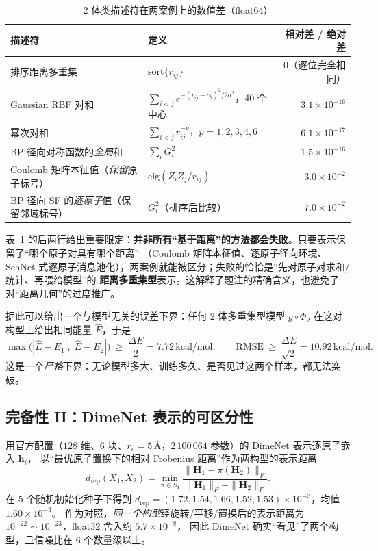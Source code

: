 \documentclass[UTF8,a4paper,11pt]{ctexart}
\newcommand{\kcal}{\,\mathrm{kcal/mol}}
\newcommand{\ang}{\,\text{\AA}}
\begin{document}
\begin{table}[H]
\centering\small
\caption{2 体类描述符在两案例上的数值差（float64）}
\label{tab:2body}
\begin{tabular}{@{}llr@{}}
\toprule
描述符 & 定义 & 相对差 / 绝对差\\
\midrule
排序距离多重集 & $\mathrm{sort}\{r_{ij}\}$ & $0$（逐位完全相同）\\
Gaussian RBF 对和 & $\sum_{i<j}e^{-(r_{ij}-c_k)^2/2\sigma^2}$，40 个中心 & $3.1\times10^{-16}$\\
幂次对和 & $\sum_{i<j}r_{ij}^{-p}$，$p=1,2,3,4,6$ & $6.1\times10^{-17}$\\
BP 径向对称函数\cite{bp}的\emph{全局}和 & $\sum_i G^2_i$ & $1.5\times10^{-16}$\\
\midrule
Coulomb 矩阵本征值\cite{cm}（\emph{保留}原子标号） & $\mathrm{eig}(Z_iZ_j/r_{ij})$ & $3.0\times10^{-2}$\\
BP 径向 SF 的\emph{逐原子}值（保留邻域标号） & $G^2_i$（排序后比较） & $7.0\times10^{-2}$\\
\bottomrule
\end{tabular}
\end{table}

表~\ref{tab:2body} 的后两行给出重要限定：\textbf{并非所有“基于距离”的方法都会失败}。只要表示保留了“哪个原子对具有哪个距离”
（Coulomb 矩阵本征值、逐原子径向环境、SchNet 式逐原子消息池化），两案例就能被区分；失败的恰恰是“先对原子对求和/统计、再喂给模型”的
\textbf{距离多重集型}表示。这解释了题注的精确含义，也避免了对“距离几何”的过度推广。

据此可以给出一个与模型无关的误差下界：任何 2 体多重集型模型 $g\circ\Phi_2$ 在这对构型上给出相同能量 $\hat E$，于是
\begin{equation}
\max\big(|\hat E-E_1|,|\hat E-E_2|\big)\ \ge\ \frac{\Delta E}{2}=7.72\kcal,\qquad
\mathrm{RMSE}\ \ge\ \frac{\Delta E}{\sqrt2}=10.92\kcal .
\label{eq:bound}
\end{equation}
这是一个\emph{严格}下界：无论模型多大、训练多久、是否见过这两个样本，都无法突破。

\subsection{完备性 II：DimeNet 表示的可区分性}
用官方配置（$128$ 维、6 块、$r_c=5\ang$，$2\,100\,064$ 参数）的 DimeNet 表示逐原子嵌入 $\bm h_i$，
以“最优原子置换下的相对 Frobenius 距离”作为两构型的表示距离
\begin{equation}
d_{\mathrm{rep}}(X_1,X_2)=\min_{\pi\in S_4}\frac{\|\bm H_1-\pi(\bm H_2)\|_F}{\|\bm H_1\|_F+\|\bm H_2\|_F}.
\end{equation}
在 5 个随机初始化种子下得到 $d_{\mathrm{rep}}=(1.72,1.54,1.66,1.52,1.53)\times10^{-3}$，均值 $1.60\times10^{-3}$。
作为对照，\emph{同一个构型}经旋转/平移/置换后的表示距离为 $10^{-22}\sim10^{-23}$，float32 舍入约 $5.7\times10^{-8}$，
因此 DimeNet 确实“看见”了两个构型，且信噪比在 6 个数量级以上。
\end{document}
